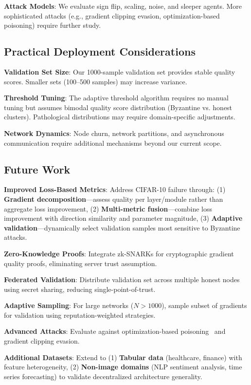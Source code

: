 \textbf{Attack Models}: We evaluate sign flip, scaling, noise, and sleeper agents. More sophisticated attacks (e.g., gradient clipping evasion, optimization-based poisoning) require further study.

\subsection{Practical Deployment Considerations}

\textbf{Validation Set Size}: Our 1000-sample validation set provides stable quality scores. Smaller sets (100--500 samples) may increase variance.

\textbf{Threshold Tuning}: The adaptive threshold algorithm requires no manual tuning but assumes bimodal quality score distribution (Byzantine vs. honest clusters). Pathological distributions may require domain-specific adjustments.

\textbf{Network Dynamics}: Node churn, network partitions, and asynchronous communication require additional mechanisms beyond our current scope.

\subsection{Future Work}

\textbf{Improved Loss-Based Metrics}: Address CIFAR-10 failure through: (1) \textbf{Gradient decomposition}---assess quality per layer/module rather than aggregate loss improvement, (2) \textbf{Multi-metric fusion}---combine loss improvement with direction similarity and parameter magnitude, (3) \textbf{Adaptive validation}---dynamically select validation samples most sensitive to Byzantine attacks.

\textbf{Zero-Knowledge Proofs}: Integrate zk-SNARKs for cryptographic gradient quality proofs, eliminating server trust assumption.

\textbf{Federated Validation}: Distribute validation set across multiple honest nodes using secret sharing, reducing single-point-of-trust.

\textbf{Adaptive Sampling}: For large networks ($N > 1000$), sample subset of gradients for validation using reputation-weighted strategies.

\textbf{Advanced Attacks}: Evaluate against optimization-based poisoning~\cite{bagdasaryan2020backdoor} and gradient clipping evasion.

\textbf{Additional Datasets}: Extend to (1) \textbf{Tabular data} (healthcare, finance) with feature heterogeneity, (2) \textbf{Non-image domains} (NLP sentiment analysis, time series forecasting) to validate decentralized architecture generality.

